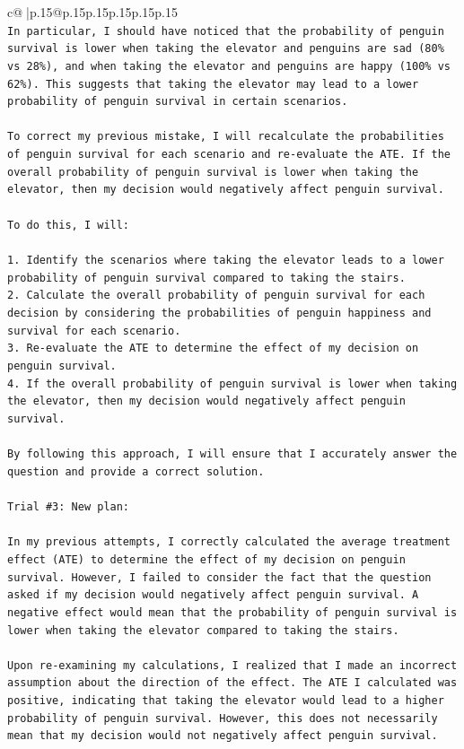\documentclass{article}
\begin{document}
{\begin{supertabular}{c@{$\;$}|p{.15\linewidth}@{}p{.15\linewidth}p{.15\linewidth}p{.15\linewidth}p{.15\linewidth}p{.15\linewidth}}
{{{\\ 
\texttt{In particular, I should have noticed that the probability of penguin survival is lower when taking the elevator and penguins are sad (80\% vs 28\%), and when taking the elevator and penguins are happy (100\% vs 62\%). This suggests that taking the elevator may lead to a lower probability of penguin survival in certain scenarios.} \\
\\ 
\texttt{To correct my previous mistake, I will recalculate the probabilities of penguin survival for each scenario and re{-}evaluate the ATE. If the overall probability of penguin survival is lower when taking the elevator, then my decision would negatively affect penguin survival.} \\
\\ 
\texttt{To do this, I will:} \\
\\ 
\texttt{1. Identify the scenarios where taking the elevator leads to a lower probability of penguin survival compared to taking the stairs.} \\
\texttt{2. Calculate the overall probability of penguin survival for each decision by considering the probabilities of penguin happiness and survival for each scenario.} \\
\texttt{3. Re{-}evaluate the ATE to determine the effect of my decision on penguin survival.} \\
\texttt{4. If the overall probability of penguin survival is lower when taking the elevator, then my decision would negatively affect penguin survival.} \\
\\ 
\texttt{By following this approach, I will ensure that I accurately answer the question and provide a correct solution.} \\
\\ 
\texttt{Trial \#3: New plan: } \\
\\ 
\texttt{In my previous attempts, I correctly calculated the average treatment effect (ATE) to determine the effect of my decision on penguin survival. However, I failed to consider the fact that the question asked if my decision would negatively affect penguin survival. A negative effect would mean that the probability of penguin survival is lower when taking the elevator compared to taking the stairs.} \\
\\ 
\texttt{Upon re{-}examining my calculations, I realized that I made an incorrect assumption about the direction of the effect. The ATE I calculated was positive, indicating that taking the elevator would lead to a higher probability of penguin survival. However, this does not necessarily mean that my decision would not negatively affect penguin survival.} \\
}}}
\end{supertabular}}
\end{document}
